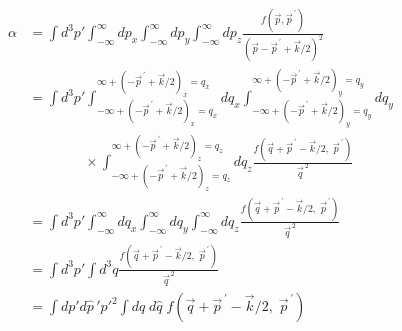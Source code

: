 \documentclass[11pt]{article}
\newcommand\ddfrac[2]{\frac{\displaystyle #1}{\displaystyle #2}}
\newcommand\vp[1]{\vec{#1}^{\,\prime}}
\newcommand{\te}[1]{+(-\vec{p}^{\,\prime}+\vec{k}/2)_#1=q_#1}
\begin{document}
\begin{align}
    \alpha&= \int d^3 p' \int_{-\infty}^{\infty} dp_x\int_{-\infty}^{\infty} dp_y\int_{-\infty}^{\infty} dp_z \ddfrac{f(\vec{p},\vp{p})}{(\vec{p}-\vp{p}+\vec{k}/2)^2}\\
          &= \int d^3 p' \int_{-\infty\te{x}}^{\infty\te{x}} dq_x\int_{-\infty\te{y}}^{\infty\te{y}}dq_y\nonumber\\
          &\qquad\qquad\times\int_{-\infty\te{z}}^{\infty\te{z}} dq_z \ddfrac{f(\vec{q}+\vp{p}-\vec{k}/2,\;\vp{p})}{\vec{q}^{\,2}}\\
    &= \int d^3 p' \int_{-\infty}^{\infty} dq_x\int_{-\infty}^{\infty} dq_y\int_{-\infty}^{\infty} dq_z \ddfrac{f(\vec{q}+\vp{p}-\vec{k}/2,\;\vp{p})}{\vec{q}^{\,2}}\\
    &= \int d^3 p' \int d^3 q \ddfrac{f(\vec{q}+\vp{p}-\vec{k}/2,\;\vp{p})}{\vec{q}^{\,2}}\\
    &= \int dp' d\widehat{p}\,'p'^2\int dq\;d\widehat{q}\;f(\vec{q}+\vp{p}-\vec{k}/2,\;\vp{p})
\end{align}
\end{document}

